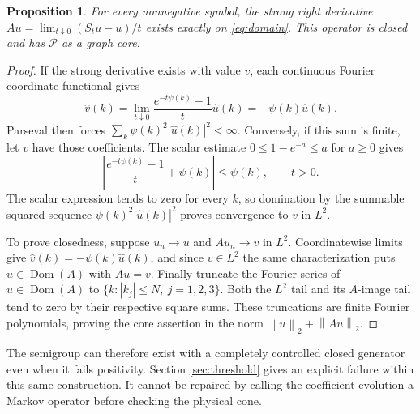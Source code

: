 \documentclass[11pt]{article}
\newtheorem{proposition}[theorem]{Proposition}
\theoremstyle{remark}\newtheorem{remark}[theorem]{Remark}
\newcommand{\norm}[1]{\left\lVert#1\right\rVert}
\DeclareMathOperator{\Dom}{Dom}
\begin{document}
\begin{proposition}\label{prop:generator}
For every nonnegative symbol, the strong right derivative
$Au=\lim_{t\downarrow0}(S_tu-u)/t$ exists exactly on
\eqref{eq:domain}. This operator is closed and has
$\mathcal P$ as a graph core.
\end{proposition}
\begin{proof}
If the strong derivative exists with value $v$, each continuous
Fourier coordinate functional gives
\[
 \widehat v(k)=\lim_{t\downarrow0}
       \frac{e^{-t\psi(k)}-1}{t}\widehat u(k)
             =-\psi(k)\widehat u(k).
\]
Parseval then forces $\sum_k\psi(k)^2|\widehat u(k)|^2<\infty$.
Conversely, if this sum is finite, let $v$ have those coefficients.
The scalar estimate $0\leq1-e^{-a}\leq a$ for $a\geq0$ gives
\[
 \left|\frac{e^{-t\psi(k)}-1}{t}+\psi(k)\right|
                                      \leq\psi(k),\qquad t>0.
\]
The scalar expression tends to zero for every $k$, so domination
by the summable squared sequence
$\psi(k)^2|\widehat u(k)|^2$ proves convergence to $v$ in $L^2$.

To prove closedness, suppose $u_n\to u$ and $Au_n\to v$ in
$L^2$. Coordinatewise limits give
$\widehat v(k)=-\psi(k)\widehat u(k)$, and since $v\in L^2$
the same characterization puts $u\in\Dom(A)$ with $Au=v$.
Finally truncate the Fourier series of $u\in\Dom(A)$ to
$\{k:|k_j|\leq N,\ j=1,2,3\}$. Both the $L^2$ tail and its
$A$-image tail tend to zero by their respective square sums.
These truncations are finite Fourier polynomials, proving the
core assertion in the norm $\norm u_2+\norm{Au}_2$.
\end{proof}

The semigroup can therefore exist with a completely controlled
closed generator even when it fails positivity. Section
\ref{sec:threshold} gives an explicit failure within this same
construction. It cannot be repaired by calling the coefficient
evolution a Markov operator before checking the physical cone.
\end{document}
